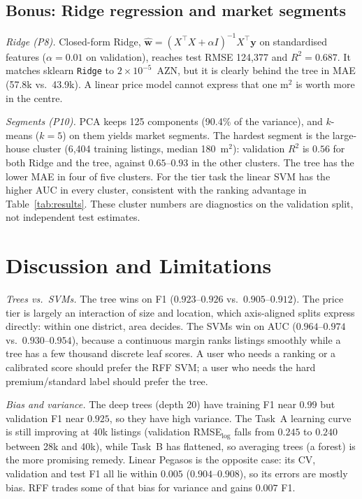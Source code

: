 \documentclass[10pt,twocolumn,a4paper]{article}
\begin{document}
\subsection{Bonus: Ridge regression and market segments}
\emph{Ridge (P8).} Closed-form Ridge,
$\hat{\mathbf w}=(X^{\top}X+\alpha I)^{-1}X^{\top}\mathbf y$ on standardised
features ($\alpha=0.01$ on validation), reaches test RMSE 124,377 and
$R^2=0.687$. It matches sklearn \texttt{Ridge} to $2\times10^{-5}$~AZN, but
it is clearly behind the tree in MAE (57.8k vs.\ 43.9k). A linear price
model cannot express that one m$^2$ is worth more in the centre.

\emph{Segments (P10).} PCA keeps 125 components (90.4\% of the variance),
and $k$-means ($k=5$) on them yields market segments. The hardest segment
is the large-house cluster (6,404 training listings, median 180~m$^2$):
validation $R^2$ is $0.56$ for both Ridge and the tree, against
$0.65$--$0.93$ in the other clusters. The tree has the lower MAE in four of
five clusters. For the tier task the linear SVM has the higher AUC in
every cluster, consistent with the ranking advantage in
Table~\ref{tab:results}. These cluster numbers are diagnostics on the
validation split, not independent test estimates.

\section{Discussion and Limitations}
\emph{Trees vs.\ SVMs.} The tree wins on F1 ($0.923$--$0.926$
vs.\ $0.905$--$0.912$). The price tier is largely an interaction of size
and location, which axis-aligned splits express directly: within one
district, area decides. The SVMs win on AUC ($0.964$--$0.974$
vs.\ $0.930$--$0.954$), because a continuous margin ranks listings
smoothly while a tree has a few thousand discrete leaf scores. A user who
needs a ranking or a calibrated score should prefer the RFF SVM; a user
who needs the hard premium/standard label should prefer the tree.

\emph{Bias and variance.} The deep trees (depth 20) have training F1
near $0.99$ but validation F1 near $0.925$, so they have high variance.
The Task~A learning curve is still improving at 40k listings (validation
RMSE$_{\log}$ falls from $0.245$ to $0.240$ between 28k and 40k), while Task~B has
flattened, so averaging trees (a forest) is the more promising remedy.
Linear Pegasos is the opposite case: its CV, validation and test F1 all
lie within $0.005$ ($0.904$--$0.908$), so its errors are mostly bias.
RFF trades some of that bias for variance and gains $0.007$ F1.
\end{document}
